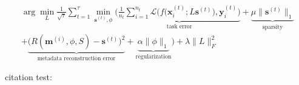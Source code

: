 \documentclass{article} %
\newcommand{\Mt}[1]{\textbf{m}^{(#1)}}
\newcommand{\Dt}[1]{D^{(#1)}}
\newcommand{\st}[1]{\textbf{s}^{(#1)}}
\newcommand{\sthat}[1]{\hat{\textbf{s}}^{(#1)}}
\newcommand{\Th}[1]{\Theta^{(#1)}}
\newcommand{\xit}[2]{\textbf{x}_{#1}^{(#2)}}
\newcommand{\yit}[2]{\textbf{y}_{#1}^{(#2)}}
\newcommand{\learnedset}[1]{\bm{D}_{#1}'}
\newcommand{\reveng}[1]{R(#1)}
\newcommand{\argmin}{\arg\!\min}
\begin{document}
%
%


\begin{multline}
	\argmin_{L} \frac{1}{\sqrt{\tau}} \sum_{t=1}^\tau 
	\min_{\st{t},\phi} \bigg(    
		 \underbrace{  \frac{1}{n_t}  \sum_{i=1}^{n_t}  \mathcal{L} \Big( f\big(\xit{i}{t};L\st{t} \big) ,\yit{i}{t} \Big)  }_\text{task error} 
		+ \underbrace{  \mu\|\st{t}\|_1  }_\text{sparsity} \\
		+ \underbrace{  \Big(\reveng{ \Mt{i}, \phi,  S  } - \st{t}  \Big)^2  }_\text{metadata reconstruction error}
		+ \underbrace{  \alpha\|\phi\|_1  }_\text{regularization}
	\bigg)  	
	+ \lambda\|L\|_F^2   
\end{multline}






citation test: \cite{Ruvolo2013}





\end{document}
